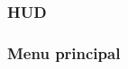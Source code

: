 \documentclass[french, 12pt]{article}
\begin{document}
        \subsubsection{HUD}
        \subsubsection{Menu principal}
        


    
    

    \newpage
    
    




\newpage
\listoffigures
\listoftables
\end{document}

